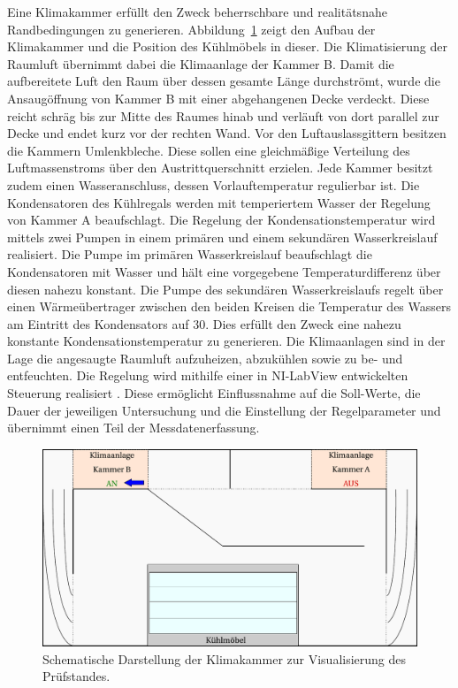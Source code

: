 Eine Klimakammer erfüllt den Zweck beherrschbare und realitätsnahe Randbedingungen zu generieren. Abbildung~\ref{fig:Klimakammer} zeigt den Aufbau der Klimakammer und die Position des Kühlmöbels in dieser. Die Klimatisierung der Raumluft übernimmt dabei die Klimaanlage der Kammer B. Damit die aufbereitete Luft den Raum über dessen gesamte Länge durchströmt, wurde die Ansaugöffnung von Kammer B mit einer abgehangenen Decke verdeckt. Diese reicht schräg bis zur Mitte des Raumes hinab und verläuft von dort parallel zur Decke und endet kurz vor der rechten Wand. Vor den Luftauslassgittern besitzen die Kammern Umlenkbleche. Diese sollen eine gleichmäßige Verteilung des Luftmassenstroms über den Austrittquerschnitt erzielen. \newline
Jede Kammer besitzt zudem einen Wasseranschluss, dessen Vorlauftemperatur regulierbar ist. Die Kondensatoren des Kühlregals werden mit temperiertem Wasser der Regelung von Kammer A beaufschlagt. Die Regelung der Kondensationstemperatur wird mittels zwei Pumpen in einem primären und einem sekundären Wasserkreislauf realisiert. Die Pumpe im primären Wasserkreislauf beaufschlagt die Kondensatoren mit Wasser und hält eine vorgegebene Temperaturdifferenz über diesen nahezu konstant. Die Pumpe des sekundären Wasserkreislaufs regelt über einen Wärmeübertrager zwischen den beiden Kreisen die Temperatur des Wassers am Eintritt des Kondensators auf \unit{30}{\celsius}. Dies erfüllt den Zweck eine nahezu konstante Kondensationstemperatur zu generieren.  \newline
Die Klimaanlagen sind in der Lage die angesaugte Raumluft aufzuheizen, abzukühlen sowie zu be- und entfeuchten. Die Regelung wird mithilfe einer in NI-LabView entwickelten Steuerung realisiert \cite{NationalInstruments.2013}. Diese ermöglicht Einflussnahme auf die Soll-Werte, die Dauer der jeweiligen Untersuchung und die Einstellung der Regelparameter und übernimmt einen Teil der Messdatenerfassung. 


\begin{figure}[htb]
\centering
\includegraphics[scale=.6]{Pictures/ClimateChamber.pdf}
\caption{Schematische Darstellung der Klimakammer zur Visualisierung des Prüfstandes.}
\label{fig:Klimakammer}
\end{figure}

